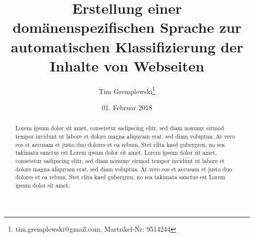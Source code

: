 \documentclass[abstract=on,parskip=half,titlepage,twoside,openright]{scrreprt}
\title{Erstellung einer domänenspezifischen Sprache zur automatischen Klassifizierung der Inhalte von Webseiten}
\author{Tim Gremplewski\thanks{tim.gremplewski@gmail.com, Martrikel-Nr: 9514244}}
\date{01. Februar 2018}
\begin{document}
	\maketitle

	\begin{abstract}
		Lorem ipsum dolor sit amet, consetetur sadipscing elitr, sed diam nonumy eirmod tempor invidunt ut labore et dolore magna aliquyam erat, sed diam voluptua. At vero eos et accusam et justo duo dolores et ea rebum. Stet clita kasd gubergren, no sea takimata sanctus est Lorem ipsum dolor sit amet. Lorem ipsum dolor sit amet, consetetur sadipscing elitr, sed diam nonumy eirmod tempor invidunt ut labore et dolore magna aliquyam erat, sed diam voluptua. At vero eos et accusam et justo duo dolores et ea rebum. Stet clita kasd gubergren, no sea takimata sanctus est Lorem ipsum dolor sit amet.
	\end{abstract}

	\newpage

	\begingroup
		\let\cleardoublepage\relax
		\tableofcontents
	\endgroup

	\newpage

	
	
	
	
	
	
	
	\appendix
	
	\sloppy
	\printbibliography[heading=bibintoc]
	
	\listoffigures
	\begingroup
		\let\cleardoublepage\relax
		\listoftables
		\lstlistoflistings
	\endgroup
\end{document}
